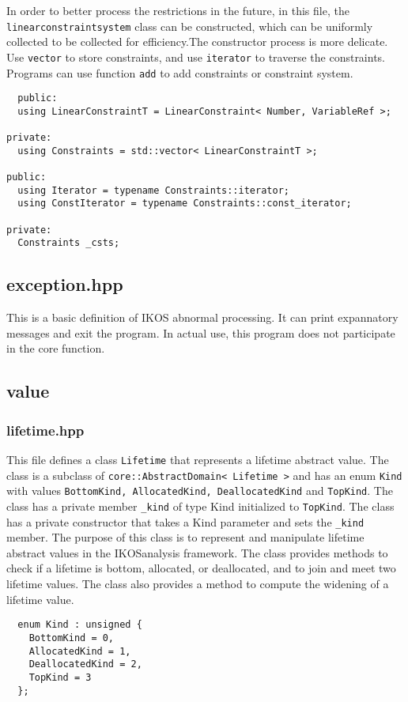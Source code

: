 \documentclass[12pt]{article}
\begin{document}
In order to better process the restrictions in the future, in this file, the \texttt {linearconstraintsystem} class can be constructed, which can be uniformly collected to be collected for efficiency.The constructor process is more delicate. Use \texttt {vector} to store constraints, and use \texttt {iterator} to traverse the constraints. Programs can use function \texttt{add} to add constraints or constraint system.

\begin{lstlisting}
  public:
  using LinearConstraintT = LinearConstraint< Number, VariableRef >;

private:
  using Constraints = std::vector< LinearConstraintT >;

public:
  using Iterator = typename Constraints::iterator;
  using ConstIterator = typename Constraints::const_iterator;

private:
  Constraints _csts;
\end{lstlisting}

\subsection{exception.hpp}

This is a basic definition of IKOS abnormal processing. It can print expannatory messages and exit the program. In actual use, this program does not participate in the core function.

\subsection{value}
\subsubsection{lifetime.hpp}
This file defines a class \texttt{Lifetime} that represents a lifetime abstract value. The class is a subclass of \texttt{core::AbstractDomain< Lifetime >} and has an enum \texttt{Kind} with values \texttt{BottomKind, AllocatedKind, DeallocatedKind} and \texttt{TopKind}. The class has a private member \texttt{\_kind} of type Kind initialized to \texttt{TopKind}. The class has a private constructor that takes a Kind parameter and sets the \texttt{\_kind} member. The purpose of this class is to represent and manipulate lifetime abstract values in the IKOSanalysis framework. The class provides methods to check if a lifetime is bottom, allocated, or deallocated, and to join and meet two lifetime values. The class also provides a method to compute the widening of a lifetime value.
\begin{lstlisting}
  enum Kind : unsigned {
    BottomKind = 0,
    AllocatedKind = 1,
    DeallocatedKind = 2,
    TopKind = 3
  };
\end{lstlisting}
\end{document}
